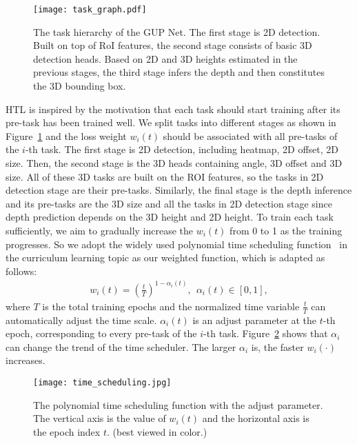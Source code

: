 \documentclass[10pt,twocolumn,letterpaper]{article}
\begin{document}
\begin{figure}[t]
\begin{center}
\texttt{[image: task\_graph.pdf]}
\end{center}
   \caption{The task hierarchy of the GUP Net. The first stage is
2D detection. Built on top of RoI features, the second stage
consists of basic 3D detection heads. Based on 2D and 3D heights
estimated in the previous stages, the third stage infers the depth and
then constitutes the 3D bounding box.}
\label{fig:task_graph}
\end{figure}

HTL is inspired by the motivation that each task should start training after its pre-task has been trained well. We split tasks into different stages as shown in Figure~\ref{fig:task_graph} and the loss weight $w_{i}(t)$ should be associated with all pre-tasks of the $i$-th task. The first stage is 2D detection, including heatmap, 2D offset, 2D size. Then, the second stage is the 3D heads containing angle, 3D offset and 3D size. All of these 3D tasks are built on the ROI features, so the tasks in 2D detection stage are their pre-tasks. Similarly, the final stage is the depth inference and its pre-tasks are the 3D size and all the tasks in 2D detection stage since depth prediction depends on the 3D height and 2D height.
To train each task sufficiently, we aim to gradually increase the $w_{i}(t)$ from 0 to 1 as the training progresses. So we adopt the widely used polynomial time scheduling function~\cite{morerio2017curriculum} in the curriculum learning topic as our weighted function, which is adapted as follows:
\begin{equation}
\begin{aligned}
     w_{i}(t) = (\frac{t}{T})^{1-{\alpha_i(t)}},\ \ \alpha_i(t) \in [0,1],
\end{aligned}
\end{equation}
where $T$ is the total training epochs and the normalized time variable $\frac{t}{T}$ can automatically adjust the time scale. ${\alpha_i}(t)$ is an adjust parameter at the $t$-th epoch, corresponding to every pre-task of the $i$-th task. Figure~\ref{fig:time_schedule} shows that ${\alpha_i}$ can change the trend of the time scheduler. The larger ${\alpha_i}$ is, the faster $w_{i}(\cdot)$ increases.
\begin{figure}[t]
\begin{center}
\texttt{[image: time\_scheduling.jpg]}
\end{center}
   \caption{The polynomial time scheduling function with the adjust parameter. The vertical axis is the value of $w_i(t)$ and the horizontal axis is the epoch index $t$. (best viewed in color.)}
\label{fig:time_schedule}
\end{figure}
\end{document}

